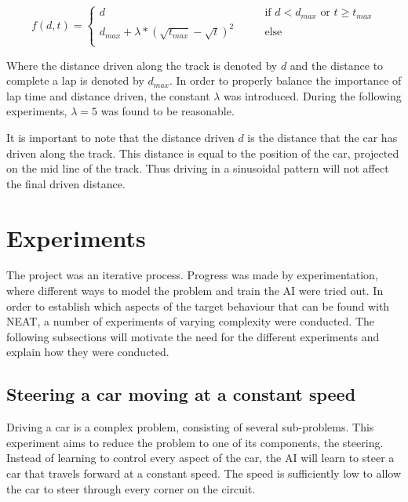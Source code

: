\begin{equation}
\label{eq:fitness_distance_time}
  f(d, t) =
  \begin{cases}
    d    & \qquad \text{if } d < d_{max} \text{ or } t \geq t_{max} \\
    d_{max} + \lambda*(\sqrt{t_{max}} - \sqrt{t})^2 & \qquad \text{else} \\
  \end{cases}
\end{equation}

\noindent
Where the distance driven along the track is denoted by $d$ and the distance to complete a lap is denoted by $d_{max}$. In order to properly balance the importance of lap time and distance driven, the constant $\lambda$ was introduced. During the following experiments, $\lambda=5$ was found to be reasonable.


It is important to note that the distance driven $d$ is the distance that the car has driven along the track. This distance is equal to the position of the car, projected on the mid line of the track. Thus driving in a sinusoidal pattern will not affect the final driven distance.


\section{Experiments}
The project was an iterative process. Progress was made by experimentation, where different ways to model the problem and train the AI were tried out. In order to establish which aspects of the target behaviour that can be found with NEAT, a number of experiments of varying complexity were conducted. The following subsections will motivate the need for the different experiments and explain how they were conducted.

\subsection{Steering a car moving at a constant speed}
\label{method:constant_speed}
Driving a car is a complex problem, consisting of several sub-problems. This experiment aims to reduce the problem to one of its components, the steering. Instead of learning to control every aspect of the car, the AI will learn to steer a car that travels forward at a constant speed. The speed is sufficiently low to allow the car to steer through every corner on the circuit. 

